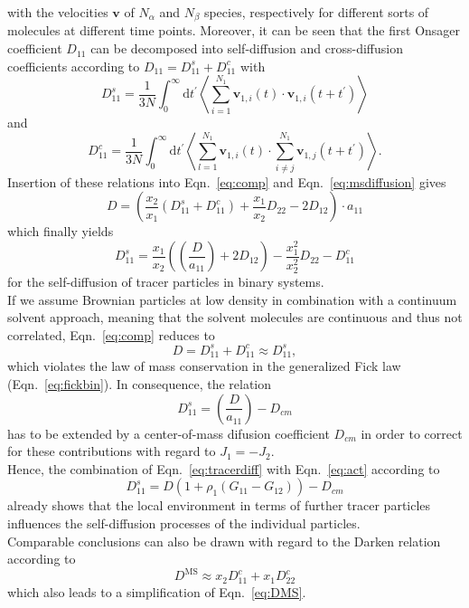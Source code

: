 \documentclass[aip,jcp,reprint]{revtex4-1}
\begin{document}
with the velocities $\mathbf{v}$ of $N_{\alpha}$ and $N_{\beta}$ species, respectively for different sorts of molecules at different time points.
Moreover, it can be seen that the first Onsager coefficient $D_{11}$  can be decomposed into self-diffusion and cross-diffusion coefficients according to $D_{11} = D_{11}^s + D_{11}^c$ with
\begin{equation}
	D_{11}^s= \frac{1}{3N}\int_0^{\infty}\textrm{d}t^{\prime}\left \langle \sum_{i=1}^{N_{1}}\mathbf{v}_{1,i}(t)\cdot \mathbf{v}_{1,i}(t+t^{\prime})\right\rangle
\end{equation}
and
\begin{equation}
	D_{11}^c= \frac{1}{3N}\int_0^{\infty}\textrm{d}t^{\prime}\left \langle \sum_{l=1}^{N_{1}}\mathbf{v}_{1,i}(t)\cdot \sum_{i\neq j}^{N_{1}}\mathbf{v}_{1,j}(t+t^{\prime})\right\rangle.
\end{equation}
Insertion of these relations into Eqn.~\eqref{eq:comp} and Eqn.~\eqref{eq:msdiffusion} gives
\begin{equation}
	D= \left(\frac{x_2}{x_1}(D_{11}^s+D_{11}^c) + \frac{x_1}{x_2}D_{22} - 2D_{12}\right)\cdot a_{11}
\end{equation}
which finally yields
\begin{equation}
	\label{eq:tracer}
	D_{11}^s = \frac{x_1}{x_2}\left(\left(\frac{D}{a_{11}}\right)+2D_{12}\right)-\frac{x_1^2}{x_2^2}D_{22}-D_{11}^c
\end{equation}
for the self-diffusion of tracer particles in binary systems.\\
If we assume Brownian particles at low density in combination with a continuum solvent approach, meaning that the solvent molecules are continuous and thus not correlated, Eqn.~\eqref{eq:comp} reduces to
\begin{equation}
	D = D_{11}^s+D_{11}^c \approx D_{11}^s,
\end{equation}
which violates the law of mass conservation in the generalized Fick law (Eqn.~\eqref{eq:fickbin}). In consequence, the relation
\begin{equation}
	\label{eq:tracerdiff}
	D_{11}^s = \left(\frac{D}{a_{11}}\right) - D_{cm}
\end{equation}
has to be extended by a center-of-mass difusion coefficient $D_{cm}$  in order to correct for these contributions with regard to $J_1 = - J_2$. \\
Hence, the combination of Eqn.~\eqref{eq:tracerdiff}  with Eqn.~\eqref{eq:act} according to
\begin{equation}
	D_{11}^s = D(1+\rho_1(G_{11}-G_{12})) - D_{cm}
\end{equation}
already shows that the local environment in terms of further tracer particles influences the self-diffusion processes of the individual particles.  \\
Comparable conclusions can also be drawn with regard to the Darken relation \cite{rosenberger20a,liu11a,liu13a,darken48a} according to
\begin{equation}
	D^{\text{MS}} \approx x_2 D_{11}^c + x_1 D_{22}^c
\end{equation}
which also leads to a simplification of Eqn.~\eqref{eq:DMS}.
\end{document}
